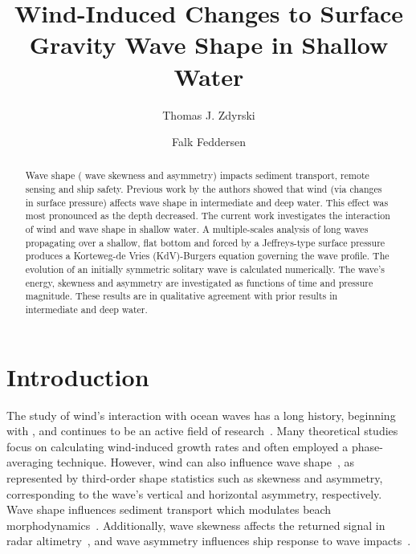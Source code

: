 \documentclass{jfm}
\title{Wind-Induced Changes to Surface Gravity Wave Shape in Shallow Water}
\author{Thomas J. Zdyrski \and Falk Feddersen}
\begin{document}
\maketitle

\begin{abstract}
Wave shape (\eg{} wave skewness and asymmetry) impacts sediment
transport, remote sensing and ship safety.
Previous work by the authors showed that wind (via changes in surface
pressure) affects wave shape in intermediate and deep water.
This effect was most pronounced as the depth decreased.
The current work investigates the interaction of wind and wave shape in
shallow water.
A multiple-scales analysis of long waves propagating over a shallow,
flat bottom and forced by a Jeffreys-type surface pressure produces a
Korteweg-de Vries (KdV)-Burgers equation governing the wave profile.
The evolution of an initially symmetric solitary wave is calculated
numerically.
The wave's energy, skewness and asymmetry are investigated as functions
of time and pressure magnitude.
These results are in qualitative agreement with prior results in
intermediate and deep water.
\end{abstract}

\section{Introduction}

The study of wind's interaction with ocean waves has a long history, beginning
with \citet{jeffreys1925formation}, and continues to be an active field
of
research~\citep[\eg][]{janssen1991quasi,donelan2004limiting,sulivan2010dynamics}.
Many theoretical
studies~\citep[\eg][]{jeffreys1925formation,miles1957generation,phillips1957generation}
focus on calculating wind-induced growth rates and often employed a
phase-averaging technique.
However, wind can also influence wave
shape~\citep[\eg][]{leykin1995asymmetry,feddersen2005wind,zdyrski2020wind},
as represented by third-order shape statistics such as skewness and
asymmetry, corresponding to the wave's vertical and horizontal
asymmetry, respectively.
Wave shape influences sediment transport
\citep[\eg][]{drake2001discrete} which modulates
beach morphodynamics~\citep[\eg][]{hoefel2003wave}.
Additionally, wave skewness affects the returned signal in radar
altimetry~\citep[\eg][]{hayne1980radar},
and wave asymmetry influences ship response to wave
impacts~\citep[\eg][]{soares2008abnormal}.
\end{document}
